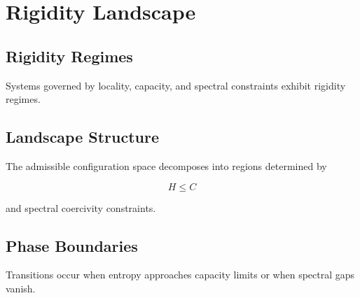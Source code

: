 \chapter{Rigidity Landscape}

\section{Rigidity Regimes}

Systems governed by locality, capacity, and spectral constraints exhibit rigidity regimes.

\section{Landscape Structure}

The admissible configuration space decomposes into regions determined by

\[
H \le C
\]

and spectral coercivity constraints.

\section{Phase Boundaries}

Transitions occur when entropy approaches capacity limits or when spectral gaps vanish.
